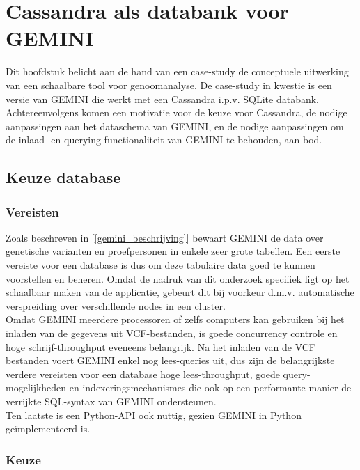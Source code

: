 \chapter{Cassandra als databank voor GEMINI}
\label{concept}

Dit hoofdstuk belicht aan de hand van een case-study de conceptuele uitwerking van een schaalbare tool voor genoomanalyse. De case-study in kwestie is een versie van GEMINI die werkt met een Cassandra i.p.v. SQLite databank. Achtereenvolgens komen een motivatie voor de keuze voor Cassandra, de nodige aanpassingen aan het dataschema van GEMINI, en de nodige aanpassingen om de inlaad- en querying-functionaliteit van GEMINI te behouden, aan bod.

\section{Keuze database}

\subsection{Vereisten}

Zoals beschreven in [\ref{gemini_beschrijving}] bewaart GEMINI de data over genetische varianten en proefpersonen in enkele zeer grote tabellen. Een eerste vereiste voor een database is dus om deze tabulaire data goed te kunnen voorstellen en beheren. Omdat de nadruk van dit onderzoek specifiek ligt op het schaalbaar maken van de applicatie, gebeurt dit bij voorkeur d.m.v. automatische verspreiding over verschillende nodes in een cluster.\\
Omdat GEMINI meerdere processoren of zelfs computers kan gebruiken bij het inladen van de gegevens uit VCF-bestanden, is goede concurrency controle en hoge schrijf-throughput eveneens belangrijk. Na het inladen van de VCF bestanden voert GEMINI enkel nog lees-queries uit, dus zijn de belangrijkste verdere vereisten voor een database hoge lees-throughput, goede query-mogelijkheden en indexeringsmechanismes die ook op een performante manier de verrijkte SQL-syntax van GEMINI ondersteunen.
\\Ten laatste is een Python-API ook nuttig, gezien GEMINI in Python ge\"implementeerd is.

\subsection{Keuze}

